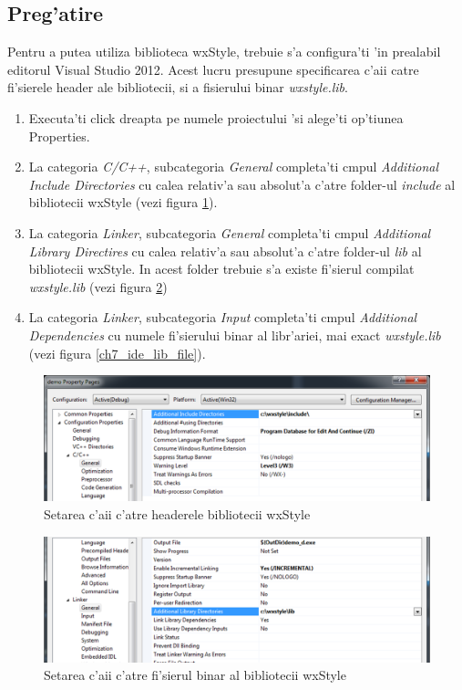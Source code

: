 \subsection{Preg'atire}

Pentru a putea utiliza biblioteca wxStyle, trebuie s'a configura'ti 'in prealabil editorul Visual Studio 2012. Acest lucru presupune specificarea c'aii catre fi'sierele header ale bibliotecii, si a fisierului binar \emph{wxstyle.lib}.

\begin{enumerate}
\item Executa'ti click dreapta pe numele proiectului 'si alege'ti op'tiunea Properties.
\item La categoria \emph{C/C++}, subcategoria \emph{General} completa'ti c{\ia}mpul \emph{Additional Include Directories} cu calea relativ'a sau absolut'a c'atre folder-ul \emph{include} al bibliotecii wxStyle (vezi figura \ref{ch7_ide_include}).
\item La categoria \emph{Linker}, subcategoria \emph{General} completa'ti c{\ia}mpul \emph{Additional Library Directires} cu calea relativ'a sau absolut'a c'atre folder-ul \emph{lib} al bibliotecii wxStyle. In acest folder trebuie s'a existe fi'sierul compilat \emph{wxstyle.lib} (vezi figura \ref{ch7_ide_lib_folder})
\item La categoria \emph{Linker}, subcategoria \emph{Input} completa'ti c{\ia}mpul \emph{Additional Dependencies} cu numele fi'sierului binar al libr'ariei, mai exact \emph{wxstyle.lib} (vezi figura \ref{ch7_ide_lib_file}).
\end{enumerate}

\begin{figure}[H]
\includegraphics[width=15cm]{img/ch7_ide_include.png}
\caption{Setarea c'aii c'atre headerele bibliotecii wxStyle}
\label{ch7_ide_include}
\end{figure}

\begin{figure}[H]
\includegraphics[width=15cm]{img/ch7_ide_lib_folder.png}
\caption{Setarea c'aii c'atre fi'sierul binar al bibliotecii wxStyle}
\label{ch7_ide_lib_folder}
\end{figure}

